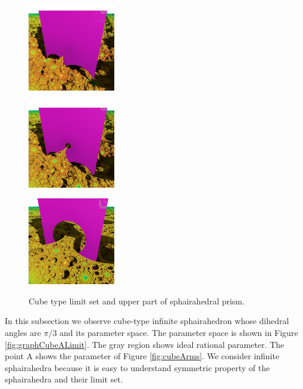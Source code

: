 \documentclass[suppldata, dvipdfmx]{interact}
\theoremstyle{plain}%
\theoremstyle{definition}
\theoremstyle{remark}
\theoremstyle{problemstyle}
\begin{document}
\begin{figure}[H]
 \begin{minipage}[t]{0.3\textwidth}
  \centering
  \includegraphics[width=1.5in, keepaspectratio]{./img/visualization/cubePrism.jpg}
  \subcaption{}
  \label{fig:upperPrism}
 \end{minipage}
 \hspace*{\fill}
 \begin{minipage}[t]{0.3\textwidth}
  \centering
  \includegraphics[width=1.5in, keepaspectratio]{./img/visualization/cubeSmallHole.jpg}
  \subcaption{}
  \label{fig:upperPrismSmallHole}
  \end{minipage}
 \hspace*{\fill}
 \begin{minipage}[t]{0.3\textwidth}
  \centering
  \includegraphics[width=1.5in, keepaspectratio]{./img/visualization/cubeHole.jpg}
  \subcaption{}
  \label{fig:upperPrismBigHole}
 \end{minipage}
 \hspace*{\fill}
 \caption{Cube type limit set and upper part of sphairahedral prism.}
 \label{fig:cubeHole}
\end{figure}

In this subsection we observe cube-type infinite sphairahedron whose
dihedral angles are $\pi / 3$ and its parameter space.
The parameter space is shown in Figure \ref{fig:graphCubeALimit}.
The gray region shows ideal rational parameter. The point A shows the
parameter of Figure \ref{fig:cubeArms}.
We consider infinite sphairahedra because it is easy to understand
symmetric property of the sphairahedra and their limit set.
\end{document}
